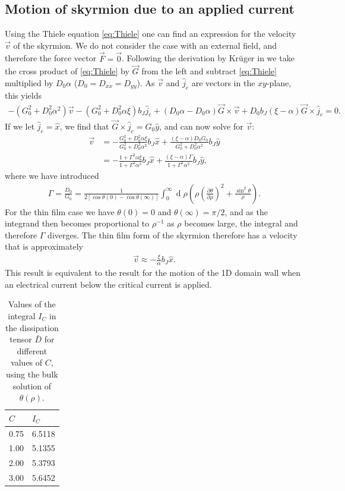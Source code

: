 \documentclass[1p]{elsarticle}		%
\renewcommand{\d}[1]{\ensuremath{\operatorname{d}\!{#1}}}
\numberwithin{equation}{section}
\begin{document}
\subsection{Motion of skyrmion due to an applied current}
Using the Thiele equation \eqref{eq:Thiele} one can find an expression for the velocity $\vec{v}$ of the skyrmion. We do not consider the case with an external field, and therefore the force vector $\vec{F} = \vec{0}$. Following the derivation by Kr\"{u}ger in \cite{krugerDissertation} we take the cross product of \eqref{eq:Thiele} by $\vec{G}$ from the left and subtract \eqref{eq:Thiele} multiplied by $D_0\alpha$ ($D_0=D_{xx}=D_{yy}$). As $\vec{v}$ and $\hat{j}_e$ are vectors in the $xy$-plane, this yields
\begin{align*}
-(G_0^2+D_0^2\alpha^2)\vec{v} - (G_0^2+D_0^2\alpha\xi)b_J\hat{j}_e + (D_0\alpha-D_0\alpha)\vec{G}\times\vec{v} + D_0b_J(\xi-\alpha)\vec{G}\times\hat{j}_e = 0.
\end{align*}
If we let $\hat{j}_e = \hat{x}$, we find that $\vec{G}\times\hat{j}_e = G_0\hat{y}$, and can now solve for $\vec{v}$:
\begin{align}
\nonumber \vec{v} &= -\frac{G_0^2+D_0^2\alpha\xi}{G_0^2+D_0^2\alpha^2}b_J\hat{x} + \frac{(\xi-\alpha)D_0G_0}{G_0^2+D_0^2\alpha^2}b_J\hat{y} \\
&= -\frac{1+\Gamma^2\alpha\xi}{1+\Gamma^2\alpha^2}b_J\hat{x} + \frac{(\xi-\alpha)\Gamma}{1+\Gamma^2\alpha^2}b_J\hat{y},
\end{align}
where we have introduced
\begin{align}
\Gamma = \frac{D_0}{G_0} = \frac{1}{2[\cos\theta(0)-\cos\theta(\infty)]}\int_0^{\infty}\d \rho (\rho (\frac{\partial \theta}{\partial \rho})^2+\frac{\sin^2\theta}{\rho}).
\end{align}
For the thin film case we have $\theta(0) = 0$ and $\theta(\infty)=\pi/2$, and as the integrand then becomes proportional to $\rho^{-1}$ as $\rho$ becomes large, the integral and therefore $\Gamma$ diverges. The thin film form of the skyrmion therefore has a velocity that is approximately
\begin{align}
\vec{v} \approx -\frac{\xi}{\alpha}b_J\hat{x}.
\end{align}
This result is equivalent to the result for the motion of the 1D domain wall when an electrical current below the critical current is applied.\\
\begin{table}[h!]
	\centering
		\caption{Values of the integral $I_C$ in the dissipation tensor $\bar{D}$ for different values of $C$, using the bulk solution of $\theta(\rho)$.} 
	\begin{tabular}{l l} \hline
	$C$ & $I_C$\\ \hline
	0.75  & 6.5118\\
 	1.00  & 5.1355\\
 	2.00  & 5.3793 \\ 
 	3.00  & 5.6452 \\ \hline
	\end{tabular}
	\label{tab:C_I}
\end{table}
\end{document}
